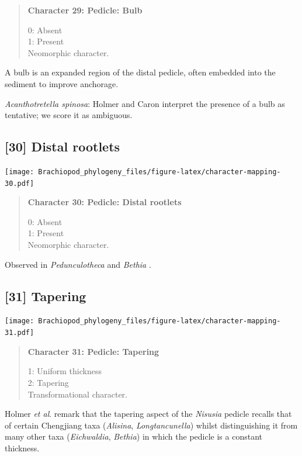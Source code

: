 \documentclass[openany]{book}
\begin{document}
\begin{quote}
\textbf{Character 29: Pedicle: Bulb}

0: Absent\\
1: Present\\
Neomorphic character.
\end{quote}

A bulb is an expanded region of the distal pedicle, often embedded into
the sediment to improve anchorage.

\hypertarget{Acanthotretella_spinosa-coding-29}{}
\emph{Acanthotretella spinosa}: Holmer and Caron
\citeyearpar{Holmer2006Aspinose} interpret the presence of a bulb as
tentative; we score it as ambiguous.

\subsection*{{[}30{]} Distal rootlets}\label{distal-rootlets}

\texttt{[image: Brachiopod\_phylogeny\_files/figure-latex/character-mapping-30.pdf]}

\begin{quote}
\textbf{Character 30: Pedicle: Distal rootlets}

0: Absent\\
1: Present\\
Neomorphic character.
\end{quote}

Observed in \emph{Pedunculotheca} and \emph{Bethia}
\citep{Sutton2005Silurianbrachiopods}.

\subsection*{{[}31{]} Tapering}\label{tapering}

\texttt{[image: Brachiopod\_phylogeny\_files/figure-latex/character-mapping-31.pdf]}

\begin{quote}
\textbf{Character 31: Pedicle: Tapering}

1: Uniform thickness\\
2: Tapering\\
Transformational character.
\end{quote}

Holmer \emph{et al}. \citeyearpar{Holmer2018Theattachment} remark that
the tapering aspect of the \emph{Nisusia} pedicle recalls that of
certain Chengjiang taxa (\emph{Alisina}, \emph{Longtancunella}) whilst
distinguishing it from many other taxa (\emph{Eichwaldia},
\emph{Bethia}) in which the pedicle is a constant thickness.
\end{document}
